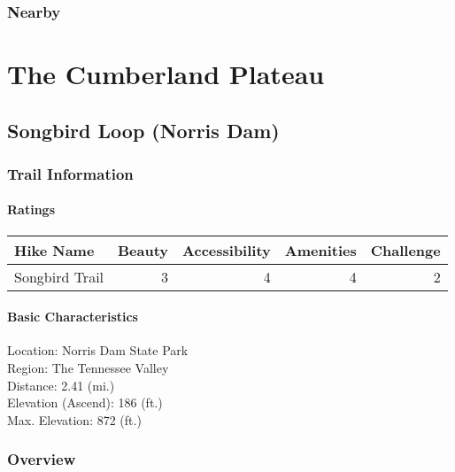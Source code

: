 \documentclass[
]{book}
\begin{document}
\hypertarget{nearby-5}{%
\section{Nearby}\label{nearby-5}}

\hypertarget{part-the-cumberland-plateau}{%
\part{The Cumberland Plateau}\label{part-the-cumberland-plateau}}

\hypertarget{songbird-loop-norris-dam}{%
\chapter{Songbird Loop (Norris Dam)}\label{songbird-loop-norris-dam}}

\hypertarget{trail-information-6}{%
\section{Trail Information}\label{trail-information-6}}

\hypertarget{ratings-1}{%
\subsection{Ratings}\label{ratings-1}}

\begin{tabular}{l|r|r|r|r}
\hline
Hike Name & Beauty & Accessibility & Amenities & Challenge\\
\hline
Songbird Trail & 3 & 4 & 4 & 2\\
\hline
\end{tabular}

\hypertarget{basic-characteristics-6}{%
\subsection{Basic Characteristics}\label{basic-characteristics-6}}

Location: Norris Dam State Park\\
Region: The Tennessee Valley\\
Distance: 2.41 (mi.)\\
Elevation (Ascend): 186 (ft.)\\
Max. Elevation: 872 (ft.)

\hypertarget{overview-6}{%
\section{Overview}\label{overview-6}}
\end{document}

